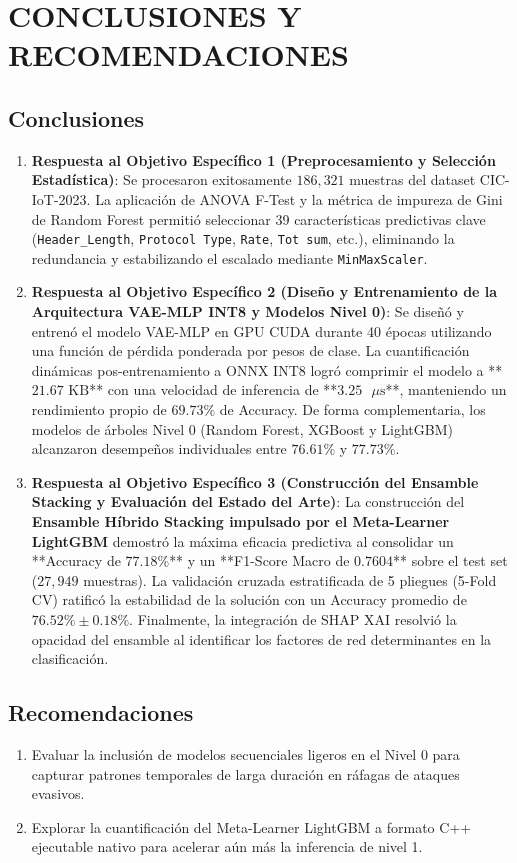\section{CONCLUSIONES Y RECOMENDACIONES}

\subsection{Conclusiones}
\begin{enumerate}[leftmargin=*]
    \item \textbf{Respuesta al Objetivo Específico 1 (Preprocesamiento y Selección Estadística)}: Se procesaron exitosamente $186,321$ muestras del dataset CIC-IoT-2023. La aplicación de ANOVA F-Test y la métrica de impureza de Gini de Random Forest permitió seleccionar 39 características predictivas clave (\texttt{Header\_Length}, \texttt{Protocol Type}, \texttt{Rate}, \texttt{Tot sum}, etc.), eliminando la redundancia y estabilizando el escalado mediante \texttt{MinMaxScaler}.
    \item \textbf{Respuesta al Objetivo Específico 2 (Diseño y Entrenamiento de la Arquitectura VAE-MLP INT8 y Modelos Nivel 0)}: Se diseñó y entrenó el modelo VAE-MLP en GPU CUDA durante 40 épocas utilizando una función de pérdida ponderada por pesos de clase. La cuantificación dinámicas pos-entrenamiento a ONNX INT8 logró comprimir el modelo a **$21.67\text{ KB}$** con una velocidad de inferencia de **$3.25\text{ }\mu\text{s}$**, manteniendo un rendimiento propio de $69.73\%$ de Accuracy. De forma complementaria, los modelos de árboles Nivel 0 (Random Forest, XGBoost y LightGBM) alcanzaron desempeños individuales entre $76.61\%$ y $77.73\%$.
    \item \textbf{Respuesta al Objetivo Específico 3 (Construcción del Ensamble Stacking y Evaluación del Estado del Arte)}: La construcción del \textbf{Ensamble Híbrido Stacking impulsado por el Meta-Learner LightGBM} demostró la máxima eficacia predictiva al consolidar un **Accuracy de $77.18\%$** y un **F1-Score Macro de $0.7604$** sobre el test set ($27,949$ muestras). La validación cruzada estratificada de 5 pliegues (5-Fold CV) ratificó la estabilidad de la solución con un Accuracy promedio de $76.52\% \pm 0.18\%$. Finalmente, la integración de SHAP XAI resolvió la opacidad del ensamble al identificar los factores de red determinantes en la clasificación.
\end{enumerate}

\subsection{Recomendaciones}
\begin{enumerate}[leftmargin=*]
    \item Evaluar la inclusión de modelos secuenciales ligeros en el Nivel 0 para capturar patrones temporales de larga duración en ráfagas de ataques evasivos.
    \item Explorar la cuantificación del Meta-Learner LightGBM a formato C++ ejecutable nativo para acelerar aún más la inferencia de nivel 1.
\end{enumerate}
